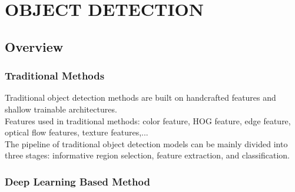 \chapter{OBJECT DETECTION}

\renewcommand{\headrulewidth}{0.5pt}
\renewcommand{\footrulewidth}{0.5pt}
\thispagestyle{plain}
\pagestyle{fancy}
\fancyhf{}
\raggedright
{}

\section{Overview}

    \subsection{Traditional Methods}
        Traditional object detection methods are built on handcrafted features and shallow trainable architectures. \\
        \vspace{3mm}
        Features used in traditional methods: color feature, HOG feature, edge feature, optical flow features, texture features,... \\
        \vspace{3mm}
        The pipeline of traditional object detection models can be mainly divided into three stages: informative region selection, feature extraction, and classification.
    
    \subsection{Deep Learning Based Method}

